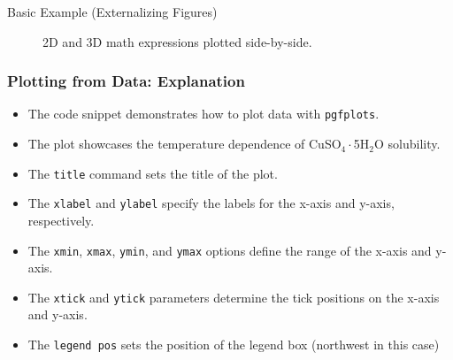 \documentclass{beamer}
\begin{document}
\begin{frame}{Basic Example (Externalizing Figures)}
\begin{figure}
  \centering
  \hskip 5pt
  \caption{2D and 3D math expressions plotted side-by-side.}
\end{figure}
\end{frame}

\begin{frame}[fragile]
  \frametitle{Plotting from Data: Explanation}

  \begin{itemize}
    \item The code snippet demonstrates how to plot data with \texttt{pgfplots}.
    \item The plot showcases the temperature dependence of CuSO\(_4\cdot\)5H\(_2\)O solubility.
    \item The \texttt{title} command sets the title of the plot.
    \item The \texttt{xlabel} and \texttt{ylabel} specify the labels for the x-axis and y-axis, respectively.
    \item The \texttt{xmin}, \texttt{xmax}, \texttt{ymin}, and \texttt{ymax} options define the range of the x-axis and y-axis.
    \item The \texttt{xtick} and \texttt{ytick} parameters determine the tick positions on the x-axis and y-axis.
    \item The \texttt{legend pos} sets the position of the legend box (northwest in this case)
  \end{itemize}

\end{frame}
\end{document}
